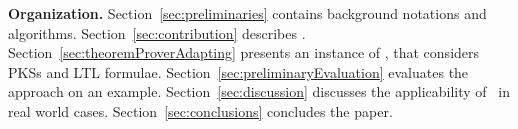 \textbf{Organization.}
Section~\ref{sec:preliminaries} contains background notations and algorithms.
Section~\ref{sec:contribution} describes \NAME.
Section~\ref{sec:theoremProverAdapting} presents an instance of \NAME , that considers PKSs and LTL formulae. 
Section~\ref{sec:preliminaryEvaluation} evaluates the approach on an example.
Section~\ref{sec:discussion} discusses the applicability of \NAME\ in real world cases.
Section~\ref{sec:conclusions} concludes the paper.